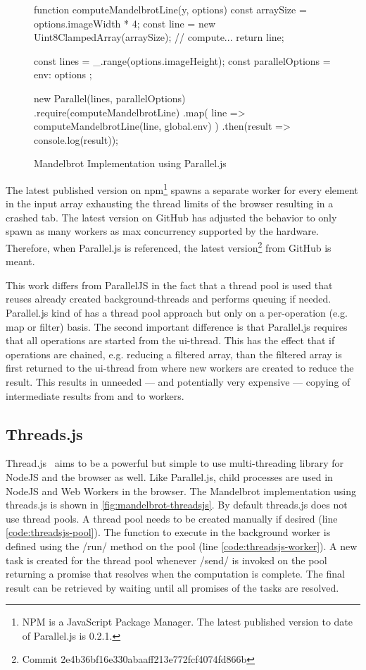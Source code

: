 \begin{figure}
	\begin{javascriptcode}
function computeMandelbrotLine(y, options) {
	const arraySize = options.imageWidth * 4;
	const line = new Uint8ClampedArray(arraySize);
	// compute...
	return line;
}

const lines = _.range(options.imageHeight);
const parallelOptions = { env: options }; 

new Parallel(lines, parallelOptions)
	.require(computeMandelbrotLine)
	.map(
		line => computeMandelbrotLine(line, global.env)
	)
	.then(result => console.log(result));
\end{javascriptcode}

\caption{Mandelbrot Implementation using Parallel.js}
\label{fig:mandelbrot-paralleljs}
\end{figure}

The latest published version on npm\footnote{NPM is a JavaScript Package Manager. The latest published version to date of Parallel.js is 0.2.1.} spawns a separate worker for every element in the input array exhausting the thread limits of the browser resulting in a crashed tab. The latest version on GitHub has adjusted the behavior to only spawn as many workers as max concurrency supported by the hardware. Therefore, when Parallel.js is referenced, the latest version\footnote{Commit 2e4b36bf16e330abaaff213e772fcf4074fd866b} from GitHub is meant.

This work differs from ParallelJS in the fact that a thread pool is used that reuses already created background-threads and performs queuing if needed. Parallel.js kind of has a thread pool approach but only on a per-operation (e.g. map or filter) basis. The second important difference is that Parallel.js requires that all operations are started from the ui-thread. This has the effect that if operations are chained, e.g. reducing a filtered array, than the filtered array is first returned to the ui-thread from where new workers are created to reduce the result. This results in unneeded --- and potentially very expensive --- copying of intermediate results from and to workers.

\subsection{Threads.js}
Thread.js~\cite{Wermke2016} aims to be a powerful but simple to use multi-threading library for NodeJS and the browser as well. Like Parallel.js, child processes are used in NodeJS and Web Workers in the browser. The Mandelbrot implementation using threads.js is shown in \cref{fig:mandelbrot-threadsjs}. By default threads.js does not use thread pools. A thread pool needs to be created manually if desired (line \ref{code:threadsjs-pool}). The function to execute in the background worker is defined using the \javascriptinline/run/ method on the pool (line \ref{code:threadsjs-worker}). A new task is created for the thread pool whenever \javascriptinline/send/ is invoked on the pool returning a promise that resolves when the computation is complete. The final result can be retrieved by waiting until all promises of the tasks are resolved.


